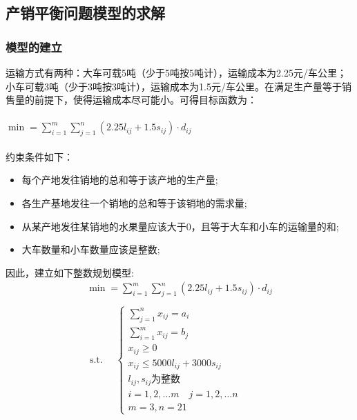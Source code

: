 \documentclass{article}
\begin{document}
	\subsection{产销平衡问题模型的求解}
	\subsubsection{模型的建立}
	运输方式有两种：大车可载5吨（少于5吨按5吨计），运输成本为2.25元/车公里；小车可载3吨（少于3吨按3吨计），运输成本为1.5元/车公里。在满足生产量等于销售量的前提下，使得运输成本尽可能小。可得目标函数为：\\
	\\
	$\min =\sum_{i=1}^{m} \sum_{j=1}^{n}\left(2.25 l_{i j}+1.5 s_{i j}\right) \cdot d_{i j}$\\
	\\
	约束条件如下：
	\begin{itemize}
	    \item 每个产地发往销地的总和等于该产地的生产量;
	    \item 各生产基地发往一个销地的总和等于该销地的需求量;
	    \item 从某产地发往某销地的水果量应该大于0，且等于大车和小车的运输量的和;
	    \item 大车数量和小车数量应该是整数;
	\end{itemize}
	因此，建立如下整数规划模型:\\
	
	$$
	\begin{array}{lr}
		\min =\sum_{i=1}^{m} \sum_{j=1}^{n}\left(2.25 l_{i j}+1.5 s_{i j}\right) \cdot d_{i j} \\
		\\
		\text { s.t. }\quad\left\{\begin{array}{lr}
			\sum_{j=1}^{n} x_{i j}=a_{i} \\
			\sum_{i=1}^{m} x_{i j}=b_{j} \\
			x_{i j} \geq 0 \\
			x_{i j}\leq 5000 l_{i j}+3000 s_{i j}\\
			l_{i j}, s_{i j}  \mbox{为整数}\\
			i=1,2, \ldots m \quad j=1,2, \ldots n \\
			m=3, n=21
			
		\end{array}\right.
	\end{array}
	$$
\end{document}
